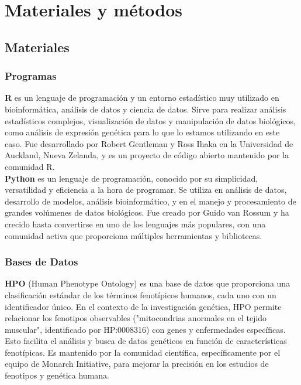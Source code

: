 \section{Materiales y métodos}


\subsection{\textbf{Materiales}}

\subsubsection{Programas}
 

\textbf{R} es un lenguaje de programación y un entorno estadístico muy utilizado en bioinformática, análisis de datos y ciencia de datos.
Sirve para realizar análisis estadísticos complejos, visualización de datos y manipulación de datos biológicos, como análisis de expresión genética para lo que lo estamos utilizando en este caso.
Fue desarrollado por Robert Gentleman y Ross Ihaka en la Universidad de Auckland, Nueva Zelanda, y es un proyecto de código abierto mantenido por la comunidad R.\\


\textbf{Python} es un lenguaje de programación, conocido por su simplicidad, versatilidad y eficiencia a la hora de programar.
Se utiliza en análisis de datos, desarrollo de modelos, análisis bioinformático, y en el manejo y procesamiento de grandes volúmenes de datos biológicos.
Fue creado por Guido van Rossum y ha crecido hasta convertirse en uno de los lenguajes más populares, con una comunidad activa que proporciona múltiples herramientas y bibliotecas.
\subsubsection{Bases de Datos}


\textbf{HPO} (Human Phenotype Ontology) es una base de datos que proporciona una clasificación estándar de los términos fenotípicos humanos, cada uno con un identificador único.
En el contexto de la investigación genética, HPO permite relacionar los fenotipos observables ("mitocondrias anormales en el tejido muscular", identificado por HP:0008316) con genes y enfermedades específicas. Esto facilita el análisis y busca de datos genéticos en función de características fenotípicas.
Es mantenido por la comunidad científica, específicamente por el equipo de Monarch Initiative, para mejorar la precisión en los estudios de fenotipos y genética humana.\\




